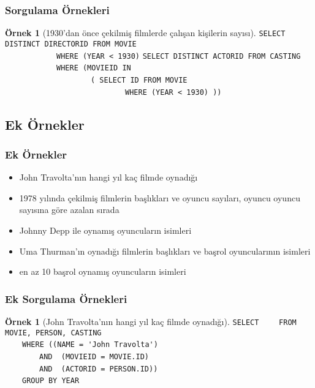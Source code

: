 \documentclass[dvipsnames]{beamer}
\theoremstyle{definition}
\theoremstyle{example}
\newtheorem{ornek}[theorem]{Örnek}
\theoremstyle{plain}
\begin{document}
\begin{frame}[fragile]
  \frametitle{Sorgulama Örnekleri}

  \begin{ornek}[1930'dan önce çekilmiş filmlerde çalışan kişilerin sayısı]
\lstinline!SELECT DISTINCT DIRECTORID FROM MOVIE!\\
~~~~~~~~~~~~\lstinline!WHERE (YEAR < 1930)!
\lstinline!SELECT DISTINCT ACTORID FROM CASTING!\\
~~~~~~~~~~~~\lstinline!WHERE (MOVIEID IN!\\
~~~~~~~~~~~~~~~~~~~~\lstinline!( SELECT ID FROM MOVIE!\\
~~~~~~~~~~~~~~~~~~~~~~~~~~~~\lstinline!WHERE (YEAR < 1930) ))!
  \end{ornek}
\end{frame}

\subsection*{Ek Örnekler}

\begin{frame}
  \frametitle{Ek Örnekler}

  \begin{itemize}
    \item John Travolta'nın hangi yıl kaç filmde oynadığı
    \item 1978 yılında çekilmiş filmlerin başlıkları ve oyuncu sayıları, oyuncu
      oyuncu sayısına göre azalan sırada
    \item Johnny Depp ile oynamış oyuncuların isimleri
    \item Uma Thurman'ın oynadığı filmlerin başlıkları ve başrol oyuncularının
      isimleri
    \item en az 10 başrol oynamış oyuncuların isimleri
  \end{itemize}
\end{frame}

\begin{frame}[fragile]
  \frametitle{Ek Sorgulama Örnekleri}

  \begin{ornek}[John Travolta'nın hangi yıl kaç filmde oynadığı]
\lstinline!SELECT! 
~~~~\lstinline!FROM MOVIE, PERSON, CASTING!\\
\pause
~~~~\lstinline!WHERE ((NAME = 'John Travolta')!\\
~~~~~~~~\lstinline!AND  (MOVIEID = MOVIE.ID)!\\
~~~~~~~~\lstinline!AND  (ACTORID = PERSON.ID))!\\
\pause
~~~~\lstinline!GROUP BY YEAR!
  \end{ornek}
\end{frame}
\end{document}
